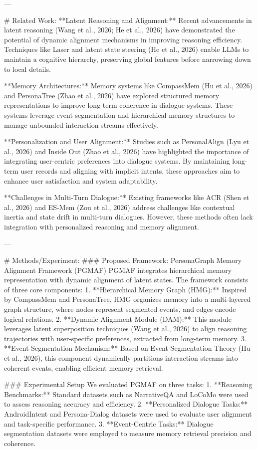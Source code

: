 ---

# Related Work:
**Latent Reasoning and Alignment:** Recent advancements in latent reasoning (Wang et al., 2026; He et al., 2026) have demonstrated the potential of dynamic alignment mechanisms in improving reasoning efficiency. Techniques like Laser and latent state steering (He et al., 2026) enable LLMs to maintain a cognitive hierarchy, preserving global features before narrowing down to local details.

**Memory Architectures:** Memory systems like CompassMem (Hu et al., 2026) and PersonaTree (Zhao et al., 2026) have explored structured memory representations to improve long-term coherence in dialogue systems. These systems leverage event segmentation and hierarchical memory structures to manage unbounded interaction streams effectively.

**Personalization and User Alignment:** Studies such as PersonalAlign (Lyu et al., 2026) and Inside Out (Zhao et al., 2026) have highlighted the importance of integrating user-centric preferences into dialogue systems. By maintaining long-term user records and aligning with implicit intents, these approaches aim to enhance user satisfaction and system adaptability.

**Challenges in Multi-Turn Dialogue:** Existing frameworks like ACR (Shen et al., 2026) and ES-Mem (Zou et al., 2026) address challenges like contextual inertia and state drift in multi-turn dialogues. However, these methods often lack integration with personalized reasoning and memory alignment.

---

# Methods/Experiment:
### Proposed Framework: PersonaGraph Memory Alignment Framework (PGMAF)
PGMAF integrates hierarchical memory representation with dynamic alignment of latent states. The framework consists of three core components:
1. **Hierarchical Memory Graph (HMG):** Inspired by CompassMem and PersonaTree, HMG organizes memory into a multi-layered graph structure, where nodes represent segmented events, and edges encode logical relations.
2. **Dynamic Alignment Module (DAM):** This module leverages latent superposition techniques (Wang et al., 2026) to align reasoning trajectories with user-specific preferences, extracted from long-term memory.
3. **Event Segmentation Mechanism:** Based on Event Segmentation Theory (Hu et al., 2026), this component dynamically partitions interaction streams into coherent events, enabling efficient memory retrieval.

### Experimental Setup
We evaluated PGMAF on three tasks:
1. **Reasoning Benchmarks:** Standard datasets such as NarrativeQA and LoCoMo were used to assess reasoning accuracy and efficiency.
2. **Personalized Dialogue Tasks:** AndroidIntent and Persona-Dialog datasets were used to evaluate user alignment and task-specific performance.
3. **Event-Centric Tasks:** Dialogue segmentation datasets were employed to measure memory retrieval precision and coherence.

